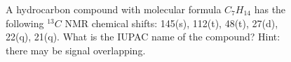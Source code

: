 \begin{figure}[t]
\centering
\setlength{\columnsep}{12pt}
\setlength{\colw}{\dimexpr(\linewidth-2\columnsep)/3\relax}

\begin{promptrow}
\caret{}\par\vspace{4pt}
A hydrocarbon compound with molecular formula $C_7H_{14}$ has the following
$^{13}C$ NMR chemical shifts: 145(s), 112(t), 48(t), 27(d), 22(q), 21(q).
What is the IUPAC name of the compound? Hint: there may be signal overlapping.
\par\vspace{6pt}
{}\par\vspace{3pt}
{\monofont\footnotesize {}}
\end{promptrow}

\vspace{12pt}


\end{figure}
